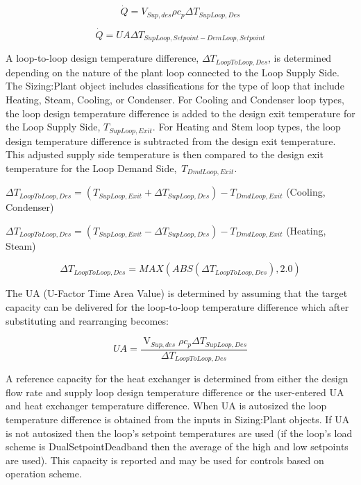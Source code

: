 \begin{equation}
\dot Q = V_{Sup,des} \rho {c_p} \Delta {T_{SupLoop,Des}}
\end{equation}

\begin{equation}
\dot Q = UA \Delta {T_{SupLoop,Setpoint - DemLoop,Setpoint}}
\end{equation}

A loop-to-loop design temperature difference, \(\Delta {T_{LoopToLoop,Des}}\), is determined depending on the nature of the plant loop connected to the Loop Supply Side. The Sizing:Plant object includes classifications for the type of loop that include Heating, Steam, Cooling, or Condenser. For Cooling and Condenser loop types, the loop design temperature difference is added to the design exit temperature for the Loop Supply Side, \({T_{SupLoop,Exit}}\). For Heating and Stem loop types, the loop design temperature difference is subtracted from the design exit temperature. This adjusted supply side temperature is then compared to the design exit temperature for the Loop Demand Side,~\({T_{DmdLoop,Exit}}\).

\(\Delta {T_{LoopToLoop,Des}} = \left( {{T_{SupLoop,Exit}} + \Delta {T_{SupLoop,Des}}} \right) - {T_{DmdLoop,Exit}}\) (Cooling, Condenser)

\(\Delta {T_{LoopToLoop,Des}} = \left( {{T_{SupLoop,Exit}} - \Delta {T_{SupLoop,Des}}} \right) - {T_{DmdLoop,Exit}}\) (Heating, Steam)

\begin{equation}
\Delta {T_{LoopToLoop,Des}} = MAX\left( {ABS\left( {\Delta {T_{LoopToLoop,Des}}} \right),2.0} \right)
\end{equation}

The UA (U-Factor Time Area Value) is determined by assuming that the target capacity can be delivered for the loop-to-loop temperature difference which after substituting and rearranging becomes:

\begin{equation}
UA = \frac{{{{\mathop {V}\limits }_{Sup,des}}\rho {c_p}\Delta {T_{SupLoop,Des}}}}{{\Delta {T_{LoopToLoop,Des}}}}
\end{equation}

A reference capacity for the heat exchanger is determined from either the design flow rate and supply loop design temperature difference or the user-entered UA and heat exchanger temperature difference. When UA is autosized the loop temperature difference is obtained from the inputs in Sizing:Plant objects. If UA is not autosized then the loop's setpoint temperatures are used (if the loop's load scheme is DualSetpointDeadband then the average of the high and low setpoints are used). This capacity is reported and may be used for controls based on operation scheme.

